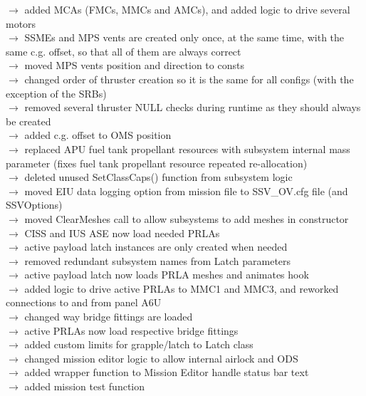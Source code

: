 \documentclass[Space_Shuttle_Vessel_Manual.tex]{subfiles}
\begin{document}
$\rightarrow$ added MCAs (FMCs, MMCs and AMCs), and added logic to drive several motors\\
$\rightarrow$ SSMEs and MPS vents are created only once, at the same time, with the same c.g. offset, so that all of them are always correct\\
$\rightarrow$ moved MPS vents position and direction to consts\\
$\rightarrow$ changed order of thruster creation so it is the same for all configs (with the exception of the SRBs)\\
$\rightarrow$ removed several thruster NULL checks during runtime as they should always be created\\
$\rightarrow$ added c.g. offset to OMS position\\
$\rightarrow$ replaced APU fuel tank propellant resources with subsystem internal mass parameter (fixes fuel tank propellant resource repeated re-allocation)\\
$\rightarrow$ deleted unused SetClassCaps() function from subsystem logic\\
$\rightarrow$ moved EIU data logging option from mission file to SSV\_OV.cfg file (and SSVOptions)\\
$\rightarrow$ moved ClearMeshes call to allow subsystems to add meshes in constructor\\
$\rightarrow$ CISS and IUS ASE now load needed PRLAs\\
$\rightarrow$ active payload latch instances are only created when needed\\
$\rightarrow$ removed redundant subsystem names from Latch parameters\\
$\rightarrow$ active payload latch now loads PRLA meshes and animates hook\\
$\rightarrow$ added logic to drive active PRLAs to MMC1 and MMC3, and reworked connections to and from panel A6U\\
$\rightarrow$ changed way bridge fittings are loaded\\
$\rightarrow$ active PRLAs now load respective bridge fittings\\
$\rightarrow$ added custom limits for grapple/latch to Latch class\\
$\rightarrow$ changed mission editor logic to allow internal airlock and ODS\\
$\rightarrow$ added wrapper function to Mission Editor handle status bar text\\
$\rightarrow$ added mission test function\\
\end{document}
